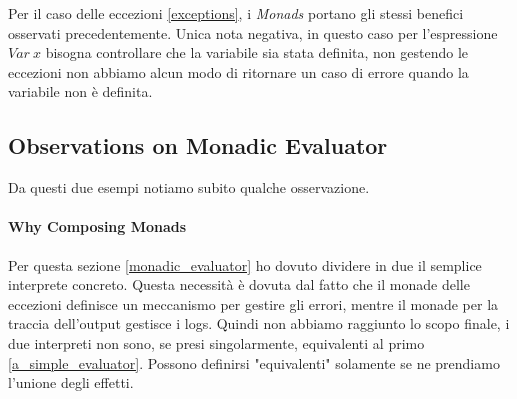 Per il caso delle eccezioni \ref{exceptions}, i
\textit{Monads} portano gli stessi benefici osservati precedentemente.
Unica nota negativa, in questo caso per l'espressione $Var\ x$ bisogna
controllare che la variabile sia stata definita, non gestendo le eccezioni non
abbiamo alcun modo di ritornare un caso di errore quando la variabile non è
definita.

\pagebreak

\subsection{Observations on Monadic Evaluator}
\label{observations_on_monadic_evaluator}
Da questi due esempi notiamo subito qualche osservazione.

\paragraph*{Why Composing Monads}
\label{why_composing_monads}
Per questa sezione \ref{monadic_evaluator}
ho dovuto dividere in due il semplice interprete concreto.
Questa necessità è dovuta dal fatto che il monade delle eccezioni definisce un
meccanismo per gestire gli errori, mentre il monade per la traccia dell'output
gestisce i logs.
Quindi non abbiamo raggiunto lo scopo finale, i due interpreti non sono, se
presi singolarmente, equivalenti al primo \ref{a_simple_evaluator}.
Possono definirsi "equivalenti" solamente se ne prendiamo l'unione degli
effetti.\newline

